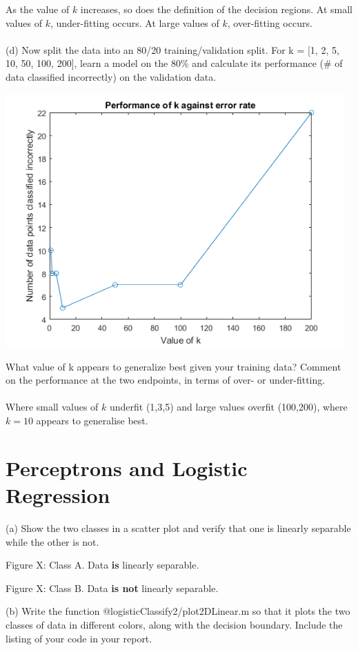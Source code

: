 \documentclass[]{report}   %
\begin{document}
{As the value of $k$ increases, so does the definition of the decision regions. At small values of $k$, under-fitting occurs. At large values of $k$, over-fitting occurs.}
\\~\\
{(d) Now split the data into an 80/20 training/validation split. For k = [1, 2, 5, 10, 50, 100, 200], learn a model on the 80$\%$ and calculate its performance ($\#$ of data classified incorrectly) on the validation data.}
\begin{center}
	\includegraphics[width=35em]{2_4_Figure_6.png}
\end{center} 
{What value of k appears to generalize best given your training data? Comment on the performance at the two endpoints, in terms of over- or under-fitting.} \\~\\
{Where small values of $k$ underfit (1,3,5) and large values overfit (100,200), where $k = 10$ appears to generalise best.}



\section{Perceptrons and Logistic Regression}
{(a) Show the two classes in a scatter plot and verify that one is linearly separable while the other is not.}
\begin{center}
	{Figure X: Class A. Data {\bf is} linearly separable.}
\end{center} 
\begin{center}
	{Figure X: Class B. Data {\bf is not} linearly separable.}
\end{center} 
{(b) Write the function @logisticClassify2/plot2DLinear.m so that it plots the two
classes of data in different colors, along with the decision boundary. Include the listing of your code in your report.}
\end{document}

